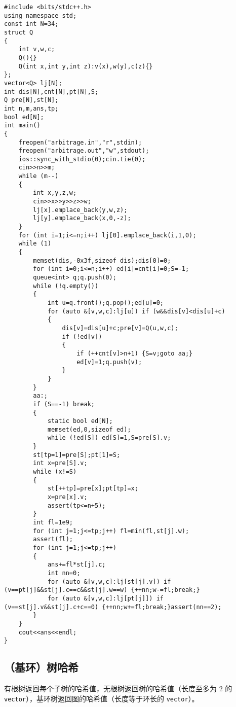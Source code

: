 \documentclass[12pt]{ctexart}
\begin{document}
\begin{lstlisting}
#include <bits/stdc++.h>
using namespace std;
const int N=34;
struct Q
{
	int v,w,c;
	Q(){}
	Q(int x,int y,int z):v(x),w(y),c(z){}
};
vector<Q> lj[N];
int dis[N],cnt[N],pt[N],S;
Q pre[N],st[N];
int n,m,ans,tp;
bool ed[N];
int main()
{
	freopen("arbitrage.in","r",stdin);
	freopen("arbitrage.out","w",stdout);
	ios::sync_with_stdio(0);cin.tie(0);
	cin>>n>>m;
	while (m--)
	{
		int x,y,z,w;
		cin>>x>>y>>z>>w;
		lj[x].emplace_back(y,w,z);
		lj[y].emplace_back(x,0,-z);
	}
	for (int i=1;i<=n;i++) lj[0].emplace_back(i,1,0);
	while (1)
	{
		memset(dis,-0x3f,sizeof dis);dis[0]=0;
		for (int i=0;i<=n;i++) ed[i]=cnt[i]=0;S=-1;
		queue<int> q;q.push(0);
		while (!q.empty())
		{
			int u=q.front();q.pop();ed[u]=0;
			for (auto &[v,w,c]:lj[u]) if (w&&dis[v]<dis[u]+c)
			{
				dis[v]=dis[u]+c;pre[v]=Q(u,w,c);
				if (!ed[v])
				{
					if (++cnt[v]>n+1) {S=v;goto aa;}
					ed[v]=1;q.push(v);
				}
			}
		}
		aa:;
		if (S==-1) break;
		{
			static bool ed[N];
			memset(ed,0,sizeof ed);
			while (!ed[S]) ed[S]=1,S=pre[S].v;
		}
		st[tp=1]=pre[S];pt[1]=S;
		int x=pre[S].v;
		while (x!=S)
		{
			st[++tp]=pre[x];pt[tp]=x;
			x=pre[x].v;
			assert(tp<=n+5);
		}
		int fl=1e9;
		for (int j=1;j<=tp;j++) fl=min(fl,st[j].w);
		assert(fl);
		for (int j=1;j<=tp;j++)
		{
			ans+=fl*st[j].c;
			int nn=0;
			for (auto &[v,w,c]:lj[st[j].v]) if (v==pt[j]&&st[j].c==c&&st[j].w==w) {++nn;w-=fl;break;}
			for (auto &[v,w,c]:lj[pt[j]]) if (v==st[j].v&&st[j].c+c==0) {++nn;w+=fl;break;}assert(nn==2);
		}
	}
	cout<<ans<<endl;
}
\end{lstlisting}

\subsection{（基环）树哈希}

有根树返回每个子树的哈希值，无根树返回树的哈希值（长度至多为 $2$ 的 \verb|vector|），基环树返回图的哈希值（长度等于环长的 \verb|vector|）。
\end{document}
